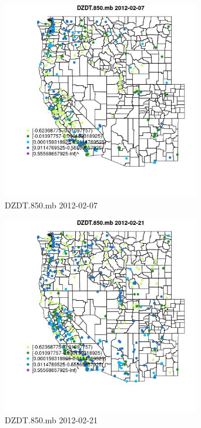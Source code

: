 \begin{figure} 
\centering  
\includegraphics[width=0.77\textwidth]{Code_Outputs/Report_ML_input_PM25_Step4_part_f_de_duplicated_aves_prioritize_24hr_obswNAs_MapObsDZDT850mb2012-02-07.jpg} 
\caption{\label{fig:Report_ML_input_PM25_Step4_part_f_de_duplicated_aves_prioritize_24hr_obswNAsMapObsDZDT850mb2012-02-07}DZDT.850.mb 2012-02-07} 
\end{figure} 
 

\begin{figure} 
\centering  
\includegraphics[width=0.77\textwidth]{Code_Outputs/Report_ML_input_PM25_Step4_part_f_de_duplicated_aves_prioritize_24hr_obswNAs_MapObsDZDT850mb2012-02-21.jpg} 
\caption{\label{fig:Report_ML_input_PM25_Step4_part_f_de_duplicated_aves_prioritize_24hr_obswNAsMapObsDZDT850mb2012-02-21}DZDT.850.mb 2012-02-21} 
\end{figure} 
 

